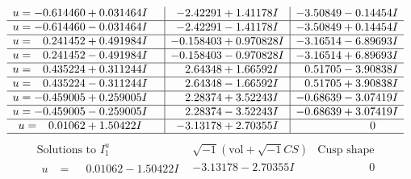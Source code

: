\documentclass[1p]{elsarticle_modified}
\theoremstyle{definition}
\newcommand{\I}{\sqrt{-1}}
\begin{document}
$$\begin{array}{c|c|c}
\begin{aligned}
u &= -0.614460 + 0.031464 I\end{aligned}
 & -2.42291 + 1.41178 I & -3.50849 - 0.14454 I \\ \hline\begin{aligned}
u &= -0.614460 - 0.031464 I\end{aligned}
 & -2.42291 - 1.41178 I & -3.50849 + 0.14454 I \\ \hline\begin{aligned}
u &= \phantom{-}0.241452 + 0.491984 I\end{aligned}
 & -0.158403 + 0.970828 I & -3.16514 - 6.89693 I \\ \hline\begin{aligned}
u &= \phantom{-}0.241452 - 0.491984 I\end{aligned}
 & -0.158403 - 0.970828 I & -3.16514 + 6.89693 I \\ \hline\begin{aligned}
u &= \phantom{-}0.435224 + 0.311244 I\end{aligned}
 & \phantom{-}2.64348 + 1.66592 I & \phantom{-}0.51705 - 3.90838 I \\ \hline\begin{aligned}
u &= \phantom{-}0.435224 - 0.311244 I\end{aligned}
 & \phantom{-}2.64348 - 1.66592 I & \phantom{-}0.51705 + 3.90838 I \\ \hline\begin{aligned}
u &= -0.459005 + 0.259005 I\end{aligned}
 & \phantom{-}2.28374 + 3.52243 I & -0.68639 - 3.07419 I \\ \hline\begin{aligned}
u &= -0.459005 - 0.259005 I\end{aligned}
 & \phantom{-}2.28374 - 3.52243 I & -0.68639 + 3.07419 I \\ \hline\begin{aligned}
u &= \phantom{-}0.01062 + 1.50422 I\end{aligned}
 & -3.13178 + 2.70355 I & \phantom{-0.000000 } 0\\
 \hline 
 \end{array}$$\newpage$$\begin{array}{c|c|c}  
\text{Solutions to }I^u_{1}& \I (\text{vol} + \sqrt{-1}CS) & \text{Cusp shape}\\
 \hline 
\begin{aligned}
u &= \phantom{-}0.01062 - 1.50422 I\end{aligned}
 & -3.13178 - 2.70355 I & \phantom{-0.000000 } 0 \\ \hline\begin{aligned}

\end{aligned}
\end{array}$$
\end{document}
